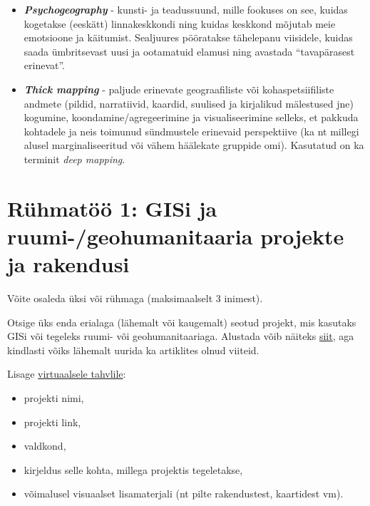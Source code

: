 \documentclass[
]{book}
\providecommand{\tightlist}{%
  \setlength{\itemsep}{0pt}\setlength{\parskip}{0pt}}
\begin{document}
\begin{itemize}
\item
  \textbf{\emph{Psychogeography}} - kunsti- ja teadussuund, mille fookuses on see, kuidas kogetakse (eeskätt) linnakeskkondi ning kuidas keskkond mõjutab meie emotsioone ja käitumist. Sealjuures pööratakse tähelepanu viisidele, kuidas saada ümbritsevast uusi ja ootamatuid elamusi ning avastada ``tavapärasest erinevat''.\\
\item
  \textbf{\emph{Thick mapping}} - paljude erinevate geograafiliste või kohaspetsiifiliste andmete (pildid, narratiivid, kaardid, suulised ja kirjalikud mälestused jne) kogumine, koondamine/agregeerimine ja visualiseerimine selleks, et pakkuda kohtadele ja neis toimunud sündmustele erinevaid perspektiive (ka nt millegi alusel marginaliseeritud või vähem häälekate gruppide omi). Kasutatud on ka terminit \emph{deep mapping}.
\end{itemize}

\hypertarget{ruxfchmatuxf6uxf6-1-gisi-ja-ruumi-geohumanitaaria-projekte-ja-rakendusi}{%
\section{Rühmatöö 1: GISi ja ruumi-/geohumanitaaria projekte ja rakendusi}\label{ruxfchmatuxf6uxf6-1-gisi-ja-ruumi-geohumanitaaria-projekte-ja-rakendusi}}

Võite osaleda üksi või rühmaga (maksimaalselt 3 inimest).

Otsige üks enda erialaga (lähemalt või kaugemalt) seotud projekt, mis kasutaks GISi või tegeleks ruumi- või geohumanitaariaga. Alustada võib näiteks \href{https://anterotesis.com/wordpress/mapping-resources/dh-gis-projects/}{siit}, aga kindlasti võiks lähemalt uurida ka artiklites olnud viiteid.

Lisage \href{https://padlet.com/maarjaliisapilvik/14fuhzi8dpw9i2to}{virtuaalsele tahvlile}:

\begin{itemize}
\tightlist
\item
  projekti nimi,
\item
  projekti link,
\item
  valdkond,\\
\item
  kirjeldus selle kohta, millega projektis tegeletakse,\\
\item
  võimalusel visuaalset lisamaterjali (nt pilte rakendustest, kaartidest vm).
\end{itemize}
\end{document}
